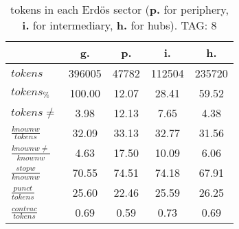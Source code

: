 \begin{table}[h!]
\begin{center}
\begin{tabular}{| l | c | c | c | c |}\hline
 & g. & p. & i. & h. \\\hline
$tokens$ & 396005  & 47782  & 112504  & 235720 \\\hline
$tokens_{\%}$ & 100.00  & 12.07  & 28.41  & 59.52 \\\hline
$tokens \neq$ & 3.98  & 12.13  & 7.65  & 4.38 \\\hline
$\frac{knownw}{tokens}$ & 32.09  & 33.13  & 32.77  & 31.56 \\\hline
$\frac{knownw \neq}{knownw}$ & 4.63  & 17.50  & 10.09  & 6.06 \\\hline
$\frac{stopw}{knownw}$ & 70.55  & 74.51  & 74.18  & 67.91 \\\hline
$\frac{punct}{tokens}$ & 25.60  & 22.46  & 25.59  & 26.25 \\\hline
$\frac{contrac}{tokens}$ & 0.69  & 0.59  & 0.73  & 0.69 \\\hline
\end{tabular}
\caption{tokens in each Erd\"os sector ({{\bf p.}} for periphery, {{\bf i.}} for intermediary, 
    {{\bf h.}} for hubs). TAG: 8}
\end{center}
\end{table}